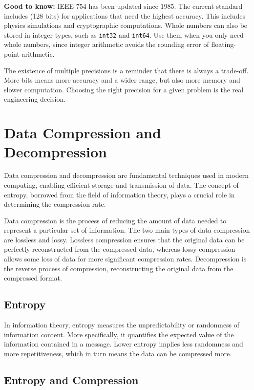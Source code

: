 \textbf{Good to know:} IEEE 754 has been updated since 1985. The current standard includes
 (128 bits) for applications
that need the highest accuracy. This includes physics simulations and cryptographic
computations. Whole numbers can also be stored in integer types, such as \texttt{int32} and \texttt{int64}. Use them when you only need whole numbers, since integer arithmetic avoids the rounding error of floating-point arithmetic. 

The existence of multiple precisions is a reminder that there is always a trade-off.
More bits means more accuracy and a wider range, but also more memory and slower
computation. Choosing the right precision for a given problem is the real engineering
decision.


\section{Data Compression and Decompression}
Data compression and decompression are fundamental techniques used in
modern computing, enabling efficient storage and transmission of
data. The concept of entropy, borrowed from the field of information
theory, plays a crucial role in determining the compression rate.

Data compression is the process of reducing the amount of data needed
to represent a particular set of information. The two main types of
data compression are lossless and lossy. Lossless compression ensures
that the original data can be perfectly reconstructed from the
compressed data, whereas lossy compression allows some loss of data
for more significant compression rates.
Decompression is the reverse process of compression, reconstructing
the original data from the compressed format.

\subsection{Entropy}

In information theory, entropy measures the unpredictability or
randomness of information content. More specifically, it quantifies
the expected value of the information contained in a message. Lower
entropy implies less randomness and more repetitiveness, which in turn
means the data can be compressed more.

\subsection{Entropy and Compression}

